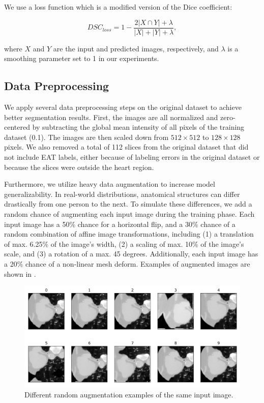 We use a loss function which is a modified version of the Dice coefficient:

  \begin{equation}
    \textit{DSC}_{loss} = 1 - \frac {2 \lvert X\cap Y \rvert + \lambda}{\lvert X \rvert + \lvert Y \rvert + \lambda},
    \label{eq:loss}
  \end{equation}
  
where $X$ and $Y$ are the input and predicted images, respectively, and $\lambda$ is a smoothing parameter set to 1 in our experiments.

\subsection{Data Preprocessing}

We apply several data preprocessing steps on the original dataset to achieve better segmentation results. First, the images are all normalized and zero-centered by subtracting the global mean intensity of all pixels of the training dataset (0.1). The images are then scaled down from $512 \times 512$ to $128 \times 128$ pixels. We also removed a total of 112 slices from the original dataset that did not include EAT labels, either because of labeling errors in the original dataset or because the slices were outside the heart region.

Furthermore, we utilize heavy data augmentation to increase model generalizability. In real-world distributions, anatomical structures can differ drastically from one person to the next. To simulate these differences, we add a random chance of augmenting each input image during the training phase. Each input image has a 50\% chance for a horizontal flip, and a 30\% chance of a random combination of affine image transformations, including (1) a translation of max. 6.25\% of the image's width, (2) a scaling of max. 10\% of the image's scale, and (3) a rotation of a max. 45 degrees. Additionally, each input image has a 20\% chance of a non-linear mesh deform. Examples of augmented images are shown in .

\begin{figure}[h]
\center
\includegraphics[width=\textwidth]{images/6/augmentation.png}
\caption{Different random augmentation examples of the same input image. \cite{bencevicEpicardialAdiposeTissue2021}}
\label{fig:augment}
\end{figure}

